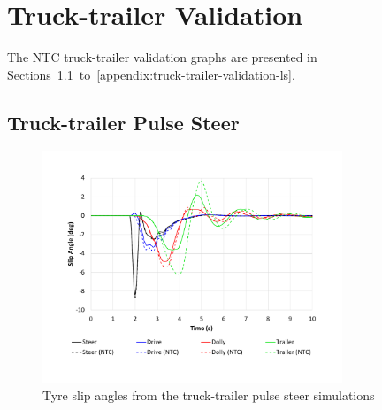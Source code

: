 \section{Truck-trailer Validation}\label{appendix:NTC-truck-trailer-validation-results}

The NTC truck-trailer validation graphs are presented in Sections~\ref{appendix:truck-trailer-validation-ps}~to~\ref{appendix:truck-trailer-validation-ls}.


\subsection{Truck-trailer Pulse Steer}\label{appendix:truck-trailer-validation-ps}

\begin{figure}[H]
	\centering
	\includegraphics[width=0.8\textwidth]{fig/ntc-truck-trailer_psa}
	\caption{Tyre slip angles from the truck-trailer pulse steer simulations}
	\label{figure:ntc-truck-trailer_psa}
\end{figure}

